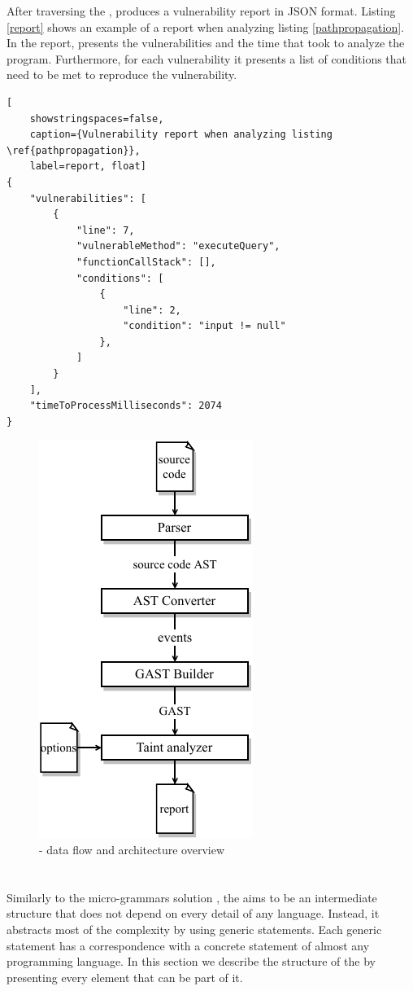 After traversing the \astname{}, \toolname{} produces a vulnerability report in JSON format. Listing \ref{report} shows an example of a report when analyzing listing \ref{pathpropagation}. In the report, \toolname{} presents the vulnerabilities and the time that took to analyze the program. Furthermore, for each vulnerability it presents a list of conditions that need to be met to reproduce the vulnerability. 

\begin{lstlisting}[
    showstringspaces=false,
    caption={Vulnerability report when analyzing listing \ref{pathpropagation}},
    label=report, float]
{
    "vulnerabilities": [
        {
            "line": 7,
            "vulnerableMethod": "executeQuery",
            "functionCallStack": [],
            "conditions": [
                {
                    "line": 2,
                    "condition": "input != null"
                },
            ]
        }
    ],
    "timeToProcessMilliseconds": 2074
}
\end{lstlisting}


\begin{figure}[hbt!]
    \centering
    \includegraphics[width =0.4\linewidth]{images/yasat-architecture.pdf}
    \caption{\toolname{} - data flow and architecture overview} 
    \label{architecture}
\end{figure}

\section{\astname{}}
\label{genericast}
Similarly to the micro-grammars solution \cite{microgrammars}, the \astname{} aims to be an intermediate structure that does not depend on every detail of any language. Instead, it abstracts most of the complexity by using generic statements. Each generic statement has a correspondence with a concrete statement of almost any programming language. In this section we describe the structure of the \astname{} by presenting every element that can be part of it. 

